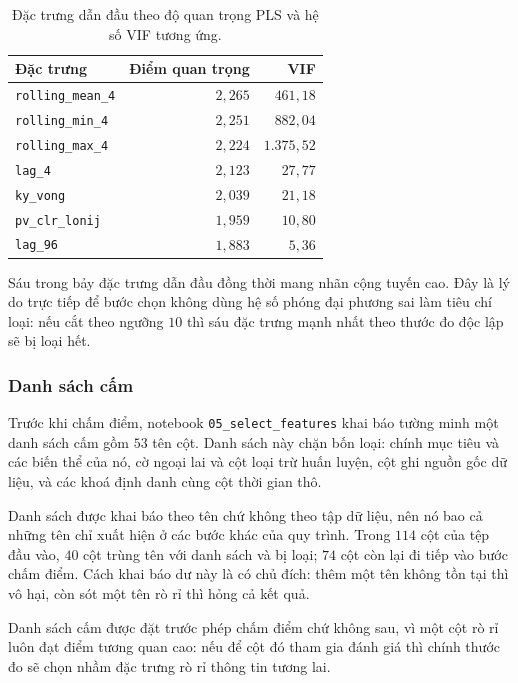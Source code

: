 \documentclass[12pt, a4paper]{report}
\begin{document}
\begin{table}[htbp]
\centering
\caption{Đặc trưng dẫn đầu theo độ quan trọng PLS và hệ số VIF tương ứng.}
\label{tab:pls}
\small
\begin{tabular}{l r r}
\toprule
\textbf{Đặc trưng} & \textbf{Điểm quan trọng} & \textbf{VIF} \\
\midrule
\texttt{rolling\_mean\_4} & $2{,}265$ & $461{,}18$ \\
\texttt{rolling\_min\_4}  & $2{,}251$ & $882{,}04$ \\
\texttt{rolling\_max\_4}  & $2{,}224$ & $1.375{,}52$ \\
\texttt{lag\_4}          & $2{,}123$ & $27{,}77$ \\
\texttt{ky\_vong}        & $2{,}039$ & $21{,}18$ \\
\texttt{pv\_clr\_lonij}   & $1{,}959$ & $10{,}80$ \\
\texttt{lag\_96}         & $1{,}883$ & $5{,}36$ \\
\bottomrule
\end{tabular}
\end{table}

Sáu trong bảy đặc trưng dẫn đầu đồng thời mang nhãn cộng tuyến cao. Đây là lý do trực tiếp để
bước chọn không dùng hệ số phóng đại phương sai làm tiêu chí loại: nếu cắt theo ngưỡng $10$ thì
sáu đặc trưng mạnh nhất theo thước đo độc lập sẽ bị loại hết.

\subsubsection{Danh sách cấm}

Trước khi chấm điểm, notebook \texttt{05\_select\_features} khai báo tường minh một danh sách cấm
gồm $53$ tên cột. Danh sách này chặn bốn loại: chính mục tiêu và các biến thể của nó, cờ ngoại
lai và cột loại trừ huấn luyện, cột ghi nguồn gốc dữ liệu, và các khoá định danh cùng cột thời
gian thô.

Danh sách được khai báo theo tên chứ không theo tập dữ liệu, nên nó bao cả những tên chỉ xuất
hiện ở các bước khác của quy trình. Trong $114$ cột của tệp đầu vào, $40$ cột trùng tên với
danh sách và bị loại; $74$ cột còn lại đi tiếp vào bước chấm điểm. Cách khai báo dư này là có
chủ đích: thêm một tên không tồn tại thì vô hại, còn sót một tên rò rỉ thì hỏng cả kết quả.

Danh sách cấm được đặt trước phép chấm điểm chứ không sau, vì một cột rò rỉ luôn đạt điểm tương quan cao: nếu để cột đó tham gia đánh giá thì chính thước đo sẽ chọn nhầm đặc trưng rò rỉ thông tin tương lai.
\end{document}
